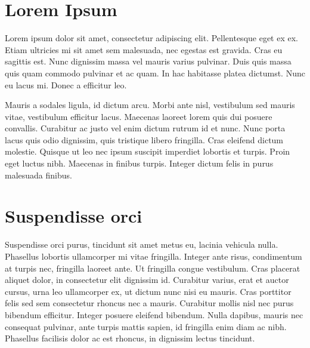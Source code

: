 \documentclass[sigconf]{acmart}
\begin{document}

\maketitle


\section{Lorem Ipsum}
Lorem ipsum dolor sit amet, consectetur adipiscing elit. Pellentesque eget ex ex. Etiam ultricies mi sit amet sem malesuada, nec egestas est gravida. Cras eu sagittis est. Nunc dignissim massa vel mauris varius pulvinar. Duis quis massa quis quam commodo pulvinar et ac quam. In hac habitasse platea dictumst. Nunc eu lacus mi. Donec a efficitur leo.

Mauris a sodales ligula, id dictum arcu. Morbi ante nisl, vestibulum sed mauris vitae, vestibulum efficitur lacus. Maecenas laoreet lorem quis dui posuere convallis. Curabitur ac justo vel enim dictum rutrum id et nunc. Nunc porta lacus quis odio dignissim, quis tristique libero fringilla. Cras eleifend dictum molestie. Quisque ut leo nec ipsum suscipit imperdiet lobortis et turpis. Proin eget luctus nibh. Maecenas in finibus turpis. Integer dictum felis in purus malesuada finibus.

\section{Suspendisse orci}
Suspendisse orci purus, tincidunt sit amet metus eu, lacinia vehicula nulla. Phasellus lobortis ullamcorper mi vitae fringilla. Integer ante risus, condimentum at turpis nec, fringilla laoreet ante. Ut fringilla congue vestibulum. Cras placerat aliquet dolor, in consectetur elit dignissim id. Curabitur varius, erat et auctor cursus, urna leo ullamcorper ex, ut dictum nunc nisi eu mauris. Cras porttitor felis sed sem consectetur rhoncus nec a mauris. Curabitur mollis nisl nec purus bibendum efficitur. Integer posuere eleifend bibendum. Nulla dapibus, mauris nec consequat pulvinar, ante turpis mattis sapien, id fringilla enim diam ac nibh. Phasellus facilisis dolor ac est rhoncus, in dignissim lectus tincidunt.
\end{document}
